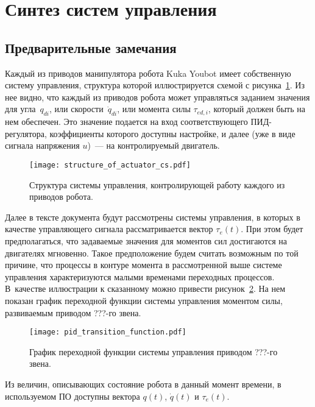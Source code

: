 \section{Синтез систем управления}\label{part_control_systems}
\subsection{Предварительные замечания}
Каждый из приводов манипулятора робота Kuka Youbot имеет собственную систему управления, структура которой иллюстрируется схемой с рисунка~\ref{img_structure_of_actuator_cs}.
Из нее видно, что каждый из приводов робота может управляться заданием значения для угла~$q_{di}$, или скорости~$\dot{q}_{di}$, или момента силы $\tau_{ed,i}$, который должен быть на нем обеспечен.
Это значение подается на вход соответствующего ПИД-регулятора, коэффициенты которого доступны настройке, и далее (уже в виде сигнала напряжения $u$)~--- на контролируемый двигатель.

\vspace{0.5cm}

\begin{figure}[h!]
	\centering\texttt{[image: structure\_of\_actuator\_cs.pdf]}
	\caption{Структура системы управления, контролирующей работу каждого из приводов робота.}
	\label{img_structure_of_actuator_cs}
\end{figure}

Далее в тексте документа будут рассмотрены системы управления, в которых в качестве управляющего сигнала рассматривается вектор $\tau_e(t)$.
При этом будет предполагаться, что задаваемые значения для моментов сил достигаются на двигателях мгновенно.
Такое предположение будем считать возможным по той причине, что процессы в контуре момента в рассмотренной выше системе управления характеризуются малыми временами переходных процессов.
В~качестве иллюстрации к сказанному можно привести рисунок~\ref{img_pid_transition_function}.
На нем показан график переходной функции системы управления моментом силы, развиваемым приводом ???-го звена.

\begin{figure}[h!]
	\centering\texttt{[image: pid\_transition\_function.pdf]}
	\caption{График переходной функции системы управления приводом ???-го звена.}
	\label{img_pid_transition_function}
\end{figure}

Из величин, описывающих состояние робота в данный момент времени, в используемом ПО доступны вектора $q(t)$, $\dot{q}(t)$ и $\tau_e(t)$.


